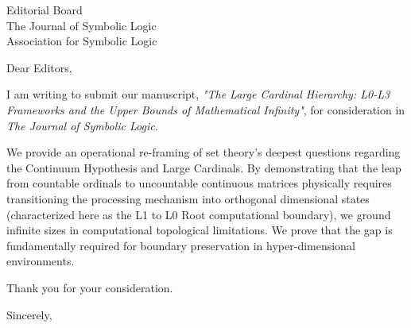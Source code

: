 \documentclass[11pt]{letter}
\begin{document}
\begin{letter}{Editorial Board \\ The Journal of Symbolic Logic \\ Association for Symbolic Logic}
\opening{Dear Editors,}

I am writing to submit our manuscript, \textit{"The Large Cardinal Hierarchy: L0-L3 Frameworks and the Upper Bounds of Mathematical Infinity"}, for consideration in \textit{The Journal of Symbolic Logic}.

We provide an operational re-framing of set theory’s deepest questions regarding the Continuum Hypothesis and Large Cardinals. By demonstrating that the leap from countable ordinals to uncountable continuous matrices physically requires transitioning the processing mechanism into orthogonal dimensional states (characterized here as the L1 to L0 Root computational boundary), we ground infinite sizes in computational topological limitations. We prove that the gap is fundamentally required for boundary preservation in hyper-dimensional environments. 

Thank you for your consideration.

\closing{Sincerely,}

\end{letter}
\end{document}
